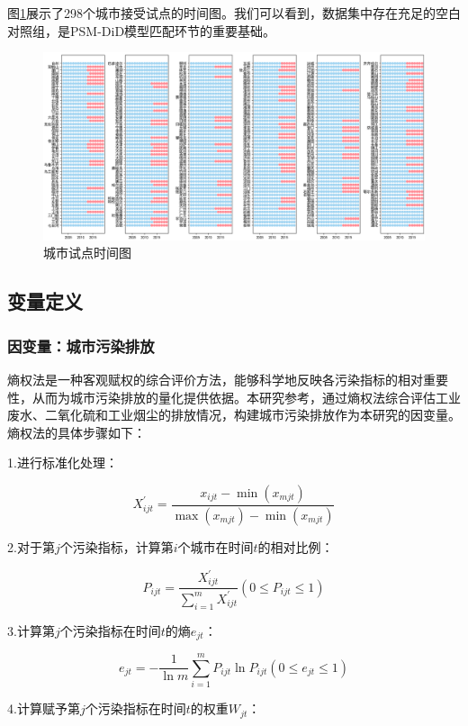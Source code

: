 \documentclass[a4paper,12pt]{article}
\begin{document}
图\ref{fig:pilot}展示了298个城市接受试点的时间图。我们可以看到，数据集中存在充足的空白对照组，是PSM-DiD模型匹配环节的重要基础。

\begin{figure}[H]
    \centering
    \includegraphics[width=\textwidth]{pilot.jpg}  
    \caption{城市试点时间图}
    \label{fig:pilot}  
\end{figure}


\subsection{变量定义}

\subsubsection{因变量：城市污染排放}

熵权法是一种客观赋权的综合评价方法，能够科学地反映各污染指标的相对重要性，从而为城市污染排放的量化提供依据。本研究参考\cite{wang2024beautifying}，通过熵权法综合评估工业废水、二氧化硫和工业烟尘的排放情况，构建城市污染排放作为本研究的因变量。熵权法的具体步骤如下：

1.进行标准化处理：

$$
    X_{i j t}^{\prime}=\frac{x_{i j t}-\min \left(x_{m j t}\right)}{\max \left(x_{m j t}\right)-\min \left(x_{m j t}\right)}
$$


2.对于第$j$个污染指标，计算第$i$个城市在时间$t$的相对比例：

$$
P_{i j t}=\frac{X_{i j t}^{\prime}}{\sum_{i=1}^m X_{i j t}^{\prime}}\left(0 \leq P_{i j t} \leq 1\right)
$$

3.计算第$j$个污染指标在时间$t$的熵$e_{jt}$：

$$
e_{j t}=-\frac{1}{\ln m} \sum_{i=1}^m P_{i j t} \ln P_{i j t}\left(0 \leq e_{j t} \leq 1\right)
$$

4.计算赋予第$j$个污染指标在时间$t$的权重$W_{jt}$：
\end{document}
